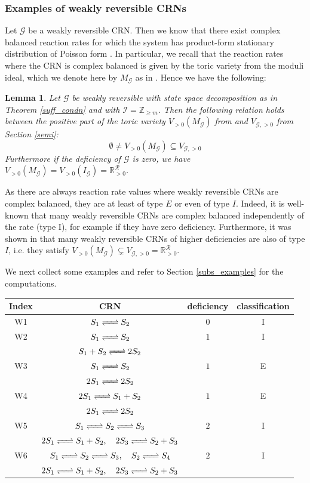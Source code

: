 \documentclass{amsart}
\newtheorem{lemma}[theorem]{Lemma}
\theoremstyle{definition}
\theoremstyle{remark}
\theoremstyle{Conjecture/open problem}
\theoremstyle{assumption}
\theoremstyle{conjecture}
\def\cG{\mathcal{G}}
\def\cR{\mathcal{R}}
\def\R{\mathbb{R}}
\def\Z{\mathbb{Z}}
\numberwithin{equation}{section}
\begin{document}
\subsubsection{Examples of weakly reversible CRNs}\hfill\break
Let $\cG$ be a weakly reversible CRN. Then we know that there exist complex balanced reaction rates for which the system has product-form stationary distribution of Poisson form \cite{anderson2}. In particular, we recall that the reaction rates where the CRN is complex balanced is given by the toric variety from the moduli ideal, which we denote here by $M_\cG$ as in \cite{sturmfels}. Hence we have the following:
\begin{lemma}\label{comp_toric}
Let $\cG$ be weakly reversible with state space decomposition as in Theorem \ref{suff_condn} and with $\mathcal{I}=\Z_{\geq m}$.
Then the following relation holds between the positive part of the toric variety $V_{>0}(M_\cG)$ from \cite{sturmfels} and $V_{\cG,>0}$ from Section \ref{semi}:
$$\emptyset\neq V_{>0}(M_\cG)\subseteq V_{\cG,>0}$$
Furthermore if the deficiency of $\cG$ is zero, we have $V_{>0}(M_\cG)= V_{>0}(I_\cG)=\R^\cR_{>0}$.
\end{lemma}
As there are always reaction rate values where weakly reversible CRNs are complex balanced, they are at least of type $E$ or even of type $I$. Indeed, it is well-known that many weakly reversible CRNs are complex balanced independently of the rate (type I), for example if they have zero deficiency. Furthermore, it was shown in \cite{hoesslyuni} that many weakly reversible CRNs of higher deficiencies 
 are also of type $I$, i.e. they satisfy $V_{>0}(M_\cG)\subsetneq V_{\cG,>0}=\R^\cR_{>0}$. 

We next collect some examples and refer to Section \ref{subs_examples} for the computations.
\begin{center}

\begin{tabular}{ |c|c|c|c| }
 \hline
Index  & CRN & deficiency &classification \\

 \hline
 W1  & $S_1\ce{<=>} S_2$ &$0$& I  \\
            \hline 
W2  & $S_1\ce{<=>} S_2$ &$1$& I  \\
&$S_1+S_2\ce{<=>} 2S_2$&&\\
            \hline
 W3  & $S_1\ce{<=>} S_2$ &$1$& E  \\
 &$2S_1\ce{<=>} 2S_2$&&\\
            \hline
 W4  & $2S_1\ce{<=>} S_1+S_2$ &$1$& E  \\
 &$2S_1\ce{<=>} 2S_2$&&\\
            \hline 
W5  & $
 S_1 \ce{<=>}S_2 \ce{<=>} S_3$
  &$2$& I  \\
  &$2S_1 \ce{<=>} S_1+S_2,\quad 2S_3\ce{<=>} S_2+S_3$&&\\
            \hline
W6  & $
 S_1 \ce{<=>}S_2 \ce{<=>} S_3, \quad S_2\ce{<=>}S_4$
  &$2$& I  \\
  &$2S_1 \ce{<=>} S_1+S_2,\quad 2S_3\ce{<=>} S_2+S_3$&&\\
            \hline
\end{tabular}
\end{center}
\end{document}
